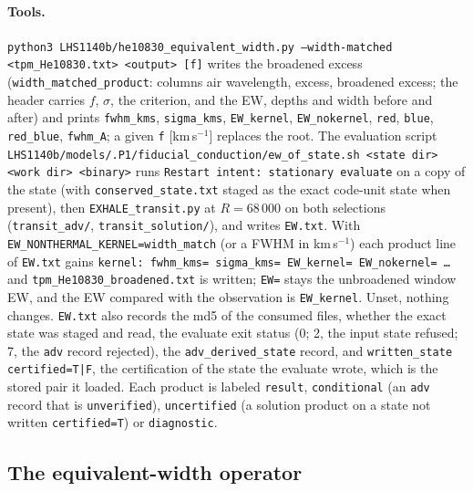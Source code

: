 \documentclass[english,a4paper]{my_memo}
\begin{document}
\paragraph{Tools.} \texttt{python3 LHS1140b/he10830\_equivalent\_width.py
--width-matched <tpm\_He10830.txt> <output> [f]} writes the broadened excess
(\texttt{width\_matched\_product}: columns air wavelength, excess, broadened
excess; the header carries $f$, $\sigma$, the criterion, and the EW, depths
and width before and after) and prints \texttt{fwhm\_kms}, \texttt{sigma\_kms},
\texttt{EW\_kernel}, \texttt{EW\_nokernel}, \texttt{red}, \texttt{blue},
\texttt{red\_blue}, \texttt{fwhm\_A}; a given \texttt{f} [km\,s$^{-1}$]
replaces the root. The evaluation script
\texttt{LHS1140b/models/.P1/fiducial\_conduction/ew\_of\_state.sh <state dir>
<work dir> <binary>} runs \texttt{Restart intent: stationary evaluate} on a
copy of the state (with \texttt{conserved\_state.txt} staged as the exact
code-unit state when present), then \texttt{EXHALE\_transit.py} at
$R = 68\,000$ on both selections (\texttt{transit\_adv/},
\texttt{transit\_solution/}), and writes \texttt{EW.txt}. With
\texttt{EW\_NONTHERMAL\_KERNEL=width\_match} (or a FWHM in km\,s$^{-1}$) each
product line of \texttt{EW.txt} gains \texttt{kernel: fwhm\_kms= sigma\_kms=
EW\_kernel= EW\_nokernel= \ldots} and \texttt{tpm\_He10830\_broadened.txt} is
written; \texttt{EW=} stays the unbroadened window EW, and the EW compared
with the observation is \texttt{EW\_kernel}. Unset, nothing changes.
\texttt{EW.txt} also records the md5 of the consumed files, whether the exact
state was staged and read, the evaluate exit status (0; 2, the input state
refused; 7, the \texttt{adv} record rejected), the \texttt{adv\_derived\_state}
record, and \texttt{written\_state certified=T|F}, the certification of the
state the evaluate wrote, which is the stored pair it loaded. Each product is
labeled \texttt{result}, \texttt{conditional} (an \texttt{adv} record that is
\texttt{unverified}), \texttt{uncertified} (a solution product on a state not
written \texttt{certified=T}) or \texttt{diagnostic}.

\subsection{The equivalent-width operator}
\label{sec:ewoperator}
\end{document}
